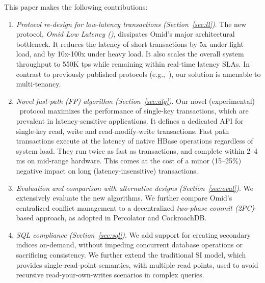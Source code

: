 This paper makes the following contributions: 
\begin{enumerate}
    \setlength{\itemsep}{1pt}
    \setlength{\parskip}{1pt}
    \setlength{\parsep}{1pt}  

\item {\em Protocol re-design for low-latency transactions (Section~\ref{sec:ll})}. 
The new protocol,    \emph{Omid Low Latency (\sysll)}, 
dissipates Omid's major architectural bottleneck. 
It reduces the latency of short transactions by 5x under light load, and 
by 10x-100x under heavy load. %
It also scales 
the overall system throughput to 550K tps while remaining 
within real-time latency SLAs. In contrast to previously published protocols 
(e.g.,~\cite{Percolator2010}), our solution is amenable to multi-tenancy.

\item {\em Novel fast-path (FP) algorithm (Section~\ref{sec:alg})\/}. 
Our  novel (experimental) \sys\ protocol  
maximizes the performance of  single-key transactions, which are prevalent 
in latency-sensitive applications. It defines a dedicated API for single-key read, 
write and read-modify-write transactions.  Fast path transactions execute at the 
latency of native HBase operations regardless of system load.
They run twice as fast as \sysll\/ transactions, and complete within 2--4 ms on mid-range hardware. 
This comes at the cost of a minor (15--25\%) negative impact on long (latency-insensitive) transactions.  

\item \emph{Evaluation and comparison with alternative designs (Section~\ref{sec:eval})}.
We extensively evaluate the new algorithms. 
We further compare Omid's  centralized conflict management  to 
a decentralized \emph{two-phase commit (2PC)}-based approach, as 
 adopted in Percolator and CockroachDB.

\item {\em SQL compliance (Section~\ref{sec:sql})\/}. 
We add support for creating secondary indices on-demand, 
without impeding concurrent database operations or sacrificing consistency. 
We further extend the traditional SI model, which provides single-read-point 
semantics, with multiple read points, used to avoid recursive 
read-your-own-writes scenarios in complex queries. 


\end{enumerate}

